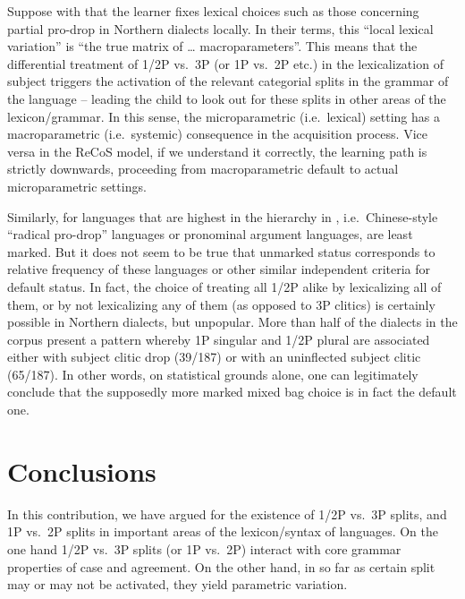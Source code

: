 \documentclass[output=paper]{langsci/langscibook}
\begin{document}
Suppose with \citeauthor{ManSav2011} that the learner fixes lexical choices such as
those concerning partial pro-drop in Northern  dialects locally. In
their terms, this “local lexical variation” is “the true matrix of …
macroparameters”. This means that the differential treatment of 1/2P vs.\ 3P (or
1P vs.\ 2P etc.) in the lexicalization of subject  triggers the
activation of the relevant categorial splits in the grammar of the language –
leading the child to look out for these splits in other areas of the
lexicon/grammar. In this sense, the microparametric (i.e.\ lexical) setting has
a macroparametric (i.e.\ systemic) consequence in the acquisition process. Vice
versa in the ReCoS model, if we understand it correctly, the learning path is
strictly downwards, proceeding from macroparametric default to actual
microparametric settings.

Similarly, for \citet{BibHolRobShee2014} languages that are highest in the
hierarchy in , i.e.\ Chinese-style “radical pro-drop”
languages or  pronominal argument languages, are least
marked. But it does not seem to be true that unmarked status corresponds to
relative frequency of these languages or other similar independent criteria for
default status. In fact, the choice of treating all 1/2P  alike by
lexicalizing all of them, or by not lexicalizing any of them (as opposed to 3P
clitics) is certainly possible in Northern  dialects, but unpopular.
More than half of the dialects in the corpus present a pattern whereby 1P
singular and 1/2P plural are associated either with subject clitic drop
(39/187) or with an uninflected subject clitic (65/187). In other words, on
statistical grounds alone, one can legitimately conclude that the supposedly
more marked mixed bag choice is in fact the default one.

\section{Conclusions}\label{sec:06.3}

In this contribution, we have argued for the existence of 1/2P vs.\ 3P splits,
and 1P vs.\ 2P splits in important areas of the lexicon/syntax of 
languages. On the one hand 1/2P vs.\ 3P splits (or 1P vs.\ 2P) interact with core
grammar properties of case and agreement. On the other hand, in so far as
certain split may or may not be activated, they yield parametric variation.
\end{document}
